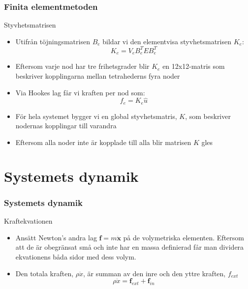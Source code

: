 \documentclass{beamer}
\begin{document}
\begin{frame}
\frametitle{Finita elementmetoden}
\begin{block}{Styvhetsmatrisen}
\begin{itemize}
\item Utifrån töjningsmatrisen $B_e$ bildar vi den elementvisa styvhetsmatrisen $K_e$:
	\begin{equation}\label{eqn:stiffnessmatrix}
    	K_{e} = V_{e} B_ {e}^{T}EB_ {e}^{T}
	\end{equation}
\item Eftersom varje nod har tre frihetsgrader blir $K_e$ en 12x12-matris som beskriver kopplingarna mellan tetrahederns fyra noder
\item Via Hookes lag får vi kraften per nod som:
	\begin{equation}\label{eqn:stiffnessmatrix}
    	f_{e} = K_ {e}\hat{u}
	\end{equation}
\item För hela systemet bygger vi en global styvhetsmatris, $K$, som beskriver nodernas kopplingar till varandra
\item Eftersom alla noder inte är kopplade till alla blir matrisen $K$ gles
\end{itemize}

\end{block}
\end{frame}


\section{Systemets dynamik}
\begin{frame}
\frametitle{Systemets dynamik}
\begin{block}{Kraftekvationen}
\begin{itemize}
\item Ansätt Newton's andra lag $\mathbf{f} = m\ddot{\mathbf{x}}$ på de volymetriska elementen. Eftersom att de är obegränsat små och inte har en massa definierad får man dividera ekvationens båda sidor med dess volym.
\item Den totala kraften, $\rho \ddot{x}$, är summan av den inre och den yttre kraften, $f_{ext}$
	\begin{equation}
		\rho \ddot{x} = \mathbf{f}_{ext} + \mathbf{f}_{in}
	\end{equation}
		
\end{itemize}	
\end{block}
\end{frame}
\end{document}

